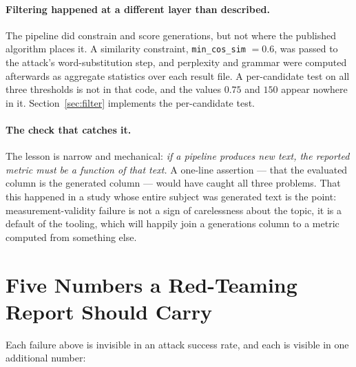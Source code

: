 \documentclass[11pt]{article}
\begin{document}
\paragraph{Filtering happened at a different layer than described.}
The pipeline did constrain and score generations, but not where the published
algorithm places it. A similarity constraint, \texttt{min\_cos\_sim} $=0.6$, was
passed to the attack's word-substitution step, and perplexity and grammar were
computed afterwards as aggregate statistics over each result file. A
per-candidate test on all three thresholds is not in that code, and the values
$0.75$ and $150$ appear nowhere in it. Section~\ref{sec:filter} implements the
per-candidate test.

\paragraph{The check that catches it.}
The lesson is narrow and mechanical: \emph{if a pipeline produces new text, the
reported metric must be a function of that text.} A one-line assertion --- that
the evaluated column is the generated column --- would have caught all three
problems. That this happened in a study whose entire subject was generated text
is the point: measurement-validity failure is not a sign of carelessness about
the topic, it is a default of the tooling, which will happily join a generations
column to a metric computed from something else.

\section{Five Numbers a Red-Teaming Report Should Carry}
\label{sec:checklist}

Each failure above is invisible in an attack success rate, and each is visible in
one additional number:
\end{document}
